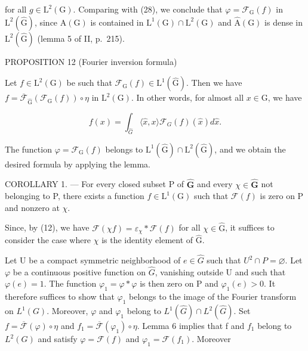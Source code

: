 for all \(g \in \mathrm{L}^{2}(\mathrm{G})\). Comparing with (28), we conclude that \(\varphi = \mathcal{F}_{\mathrm{G}}(f)\) in \(\mathrm{L}^{2}(\widehat{\mathrm{G}})\), since \(\mathrm{A}(\mathrm{G})\) is contained in \(\mathrm{L}^{1}(\mathrm{G}) \cap \mathrm{L}^{2}(\mathrm{G})\) and \(\widehat{\mathrm{A}}(\mathrm{G})\) is dense in \(\mathrm{L}^{2}(\widehat{\mathrm{G}})\) (lemma 5 of II, p.~215).

PROPOSITION 12 (Fourier inversion formula)

Let \(f \in \mathrm{L}^2(\mathrm{G})\) be such that \(\mathcal{F}_{\mathrm{G}}(f) \in \mathrm{L}^1(\widehat{\mathrm{G}})\). Then we have \(f = \overline{\mathcal{F}}_{\widehat{\mathrm{G}}}(\mathcal{F}_{\mathrm{G}}(f)) \circ \eta\) in \(\mathrm{L}^2(\mathrm{G})\). In other words, for almost all \(x \in \mathrm{G}\), we have

\[
f (x) = \int_ {\widehat {G}} \langle \widehat {x}, x \rangle \mathcal {F} _ {G} (f) (\widehat {x}) d \widehat {x}.
\]

The function \(\varphi = \mathcal{F}_{\mathrm{G}}(f)\) belongs to \(\mathrm{L}^1 (\widehat{\mathrm{G}})\cap \mathrm{L}^2 (\widehat{\mathrm{G}})\), and we obtain the desired formula by applying the lemma.

COROLLARY 1. --- For every closed subset P of \(\widehat{\mathbf{G}}\) and every \(\chi \in \widehat{\mathbf{G}}\) not belonging to P, there exists a function \(f \in \mathrm{L}^{1}(\mathrm{G})\) such that \(\mathcal{F}(f)\) is zero on P and nonzero at \(\chi\).

Since, by (12), we have \(\mathcal{F}(\chi f) = \varepsilon_{\chi} * \mathcal{F}(f)\) for all \(\chi \in \widehat{\mathrm{G}}\), it suffices to consider the case where \(\chi\) is the identity element of \(\widehat{\mathrm{G}}\).

Let U be a compact symmetric neighborhood of \(e \in \widehat{G}\) such that \(U^{2} \cap P = \varnothing\). Let \(\varphi\) be a continuous positive function on \(\widehat{G}\), vanishing outside U and such that \(\varphi(e) = 1\). The function \(\varphi_{1} = \varphi * \varphi\) is then zero on P and \(\varphi_{1}(e) > 0\). It therefore suffices to show that \(\varphi_{1}\) belongs to the image of the Fourier transform on \(L^{1}(G)\). Moreover, \(\varphi\) and \(\varphi_{1}\) belong to \(L^{1}(\widehat{G}) \cap L^{2}(\widehat{G})\). Set \(f = \overline{\mathcal{F}}(\varphi) \circ \eta\) and \(f_{1} = \overline{\mathcal{F}}(\varphi_{1}) \circ \eta\). Lemma 6 implies that f and \(f_{1}\) belong to \(L^{2}(G)\) and satisfy \(\varphi = \mathcal{F}(f)\) and \(\varphi_{1} = \mathcal{F}(f_{1})\). Moreover

